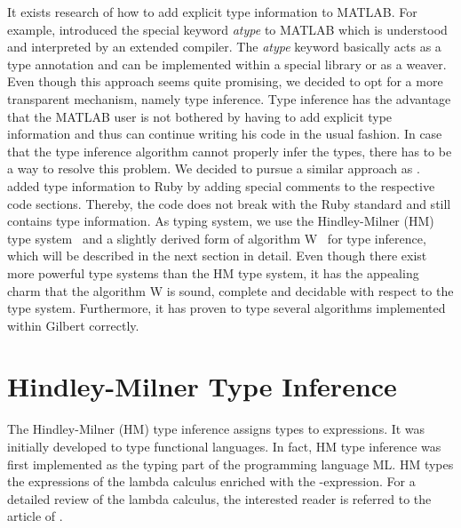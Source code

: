 It exists research of how to add explicit type information to MATLAB.
For example, \textcite{hendren:2011a} introduced the special keyword \emph{atype} to MATLAB which is understood and interpreted by an extended compiler.
The \emph{atype} keyword basically acts as a type annotation and can be implemented within a special library or as a weaver.
Even though this approach seems quite promising, we decided to opt for a more transparent mechanism, namely type inference.
Type inference has the advantage that the MATLAB user is not bothered by having to add explicit type information and thus can continue writing his code in the usual fashion.
In case that the type inference algorithm cannot properly infer the types, there has to be a way to resolve this problem.
We decided to pursue a similar approach as \textcite{furr:2009a}.
\citeauthor{furr:2009a} added type information to Ruby by adding special comments to the respective code sections.
Thereby, the code does not break with the Ruby standard and still contains type information.
As typing system, we use the Hindley-Milner (HM) type system~\cite{hindley:tams1969a,milner:jcss1978a} and a slightly derived form of algorithm W~\cite{damas:1982a} for type inference, which will be described in the next section in detail.
Even though there exist more powerful type systems than the HM type system, it has the appealing charm that the algorithm W is sound, complete and decidable with respect to the type system.
Furthermore, it has proven to type several algorithms implemented within Gilbert correctly.

\section{Hindley-Milner Type Inference}
\label{sec:hmInference}

The Hindley-Milner (HM) type inference assigns types to expressions.
It was initially developed to type functional languages.
In fact, HM type inference was first implemented as the typing part of the programming language ML.
HM types the expressions of the lambda calculus enriched with the -expression.
For a detailed review of the lambda calculus, the interested reader is referred to the article of \textcite{cardone:hhl2006a}.

